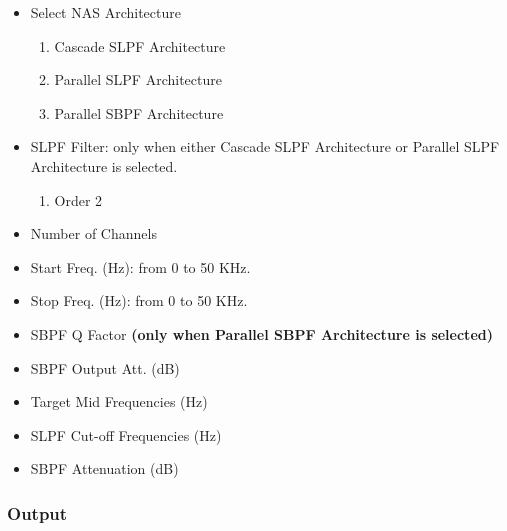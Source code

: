 \begin{itemize}
    \item Select NAS Architecture
        \begin{enumerate}
            \item Cascade SLPF Architecture
            
            \item Parallel SLPF Architecture
            
            \item Parallel SBPF Architecture
            
        \end{enumerate}
    
    \item SLPF Filter: only when either Cascade SLPF Architecture or Parallel SLPF Architecture is selected.
        \begin{enumerate}
            \item Order 2
        \end{enumerate}
    
    \item Number of Channels
    
    \item Start Freq. (Hz): from 0 to 50 KHz.%
    
    \item Stop Freq. (Hz): from 0 to 50 KHz.%
    
    \item SBPF Q Factor \textbf{(only when Parallel SBPF Architecture is selected)}
    
    \item SBPF Output Att. (dB)
    
    \item Target Mid Frequencies (Hz)
    
    \item SLPF Cut-off Frequencies (Hz)
    
    \item SBPF Attenuation (dB)
    
\end{itemize}

\subsubsection{Output}

